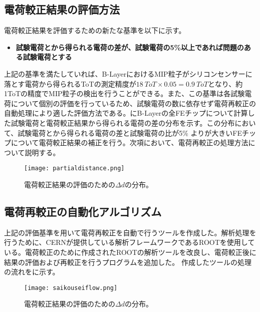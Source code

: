\subsection{電荷較正結果の評価方法}
電荷較正結果を評価するための新たな基準を以下に示す。
\begin{itemize}
  \item[]\textbf{試験電荷とから得られる電荷の差が、試験電荷の5\%以上であれば問題のある試験電荷とする}
\end{itemize}
上記の基準を満たしていれば、B-LayerにおけるMIP粒子がシリコンセンサーに落とす電荷から得られるToTの測定精度が$18\ \si{ToT}\times 0.05 = 0.9\ \si{ToT}$となり、約1ToTの精度でMIP粒子の検出を行うことができる。また、この基準は各試験電荷について個別の評価を行っているため、試験電荷の数に依存せず電荷再較正の自動処理により適した評価方法である。にB-Layerの全FEチップについて計算した試験電荷と電荷較正結果から得られる電荷の差の分布を示す。この分布において、試験電荷とから得られる電荷の差と試験電荷の比が5\% よりが大きいFEチップについて電荷較正結果の補正を行う。次項において、電荷再較正の処理方法について説明する。

\begin{figure}[tbp]
  \centering
  \texttt{[image: partialdistance.png]}
  \caption[電荷較正結果の評価のための$\Delta d$の分布]{電荷較正結果の評価のための$\Delta d$の分布。}
  \label{fig:partialdistance}
\end{figure}


\subsection{電荷再較正の自動化アルゴリズム}
上記の評価基準を用いて電荷再較正を自動で行うツールを作成した。解析処理を行うために、CERNが提供している解析フレームワークであるROOTを使用している。電荷較正のために作成されたROOTの解析ツールを改良し、電荷較正後に結果の評価および再較正を行うプログラムを追加した。
作成したツールの処理の流れをに示す。

\begin{figure}[tbp]
  \centering
  \texttt{[image: saikouseiflow.png]}
  \caption[電荷較正結果の評価のための$\Delta d$の分布]{電荷較正結果の評価のための$\Delta d$の分布。}
  \label{fig:saikouseiflow}
\end{figure}


